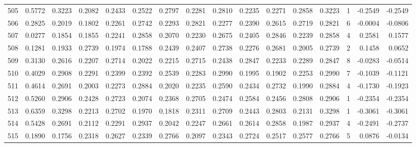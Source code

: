 \begin{tabular}{lrrrrrrrrrrrrrrr}
505 &      0.5772 &  0.3223 &  0.2082 &  0.2433 &  0.2522 &  0.2797 &  0.2281 &  0.2810 &  0.2235 &  0.2271 &   0.2858 &     0.3223 &      1 &                   -0.2549 &                    -0.2549 \\
506 &      0.2825 &  0.2019 &  0.1802 &  0.2261 &  0.2742 &  0.2293 &  0.2821 &  0.2277 &  0.2390 &  0.2615 &   0.2719 &     0.2821 &      6 &                   -0.0004 &                    -0.0806 \\
507 &      0.0277 &  0.1854 &  0.1855 &  0.2241 &  0.2858 &  0.2070 &  0.2230 &  0.2675 &  0.2405 &  0.2846 &   0.2239 &     0.2858 &      4 &                    0.2581 &                     0.1577 \\
508 &      0.1281 &  0.1933 &  0.2739 &  0.1974 &  0.1788 &  0.2439 &  0.2407 &  0.2738 &  0.2276 &  0.2681 &   0.2005 &     0.2739 &      2 &                    0.1458 &                     0.0652 \\
509 &      0.3130 &  0.2616 &  0.2207 &  0.2714 &  0.2022 &  0.2215 &  0.2715 &  0.2438 &  0.2847 &  0.2233 &   0.2289 &     0.2847 &      8 &                   -0.0283 &                    -0.0514 \\
510 &      0.4029 &  0.2908 &  0.2291 &  0.2399 &  0.2392 &  0.2539 &  0.2283 &  0.2990 &  0.1995 &  0.1902 &   0.2253 &     0.2990 &      7 &                   -0.1039 &                    -0.1121 \\
511 &      0.4614 &  0.2691 &  0.2003 &  0.2273 &  0.2884 &  0.2020 &  0.2235 &  0.2590 &  0.2434 &  0.2732 &   0.1990 &     0.2884 &      4 &                   -0.1730 &                    -0.1923 \\
512 &      0.5260 &  0.2906 &  0.2428 &  0.2723 &  0.2074 &  0.2368 &  0.2705 &  0.2474 &  0.2584 &  0.2456 &   0.2808 &     0.2906 &      1 &                   -0.2354 &                    -0.2354 \\
513 &      0.6359 &  0.3298 &  0.2213 &  0.2702 &  0.1970 &  0.1818 &  0.2311 &  0.2709 &  0.2443 &  0.2803 &   0.2131 &     0.3298 &      1 &                   -0.3061 &                    -0.3061 \\
514 &      0.5428 &  0.2691 &  0.2112 &  0.2291 &  0.2937 &  0.2042 &  0.2247 &  0.2661 &  0.2614 &  0.2858 &   0.1987 &     0.2937 &      4 &                   -0.2491 &                    -0.2737 \\
515 &      0.1890 &  0.1756 &  0.2318 &  0.2627 &  0.2339 &  0.2766 &  0.2097 &  0.2343 &  0.2724 &  0.2517 &   0.2577 &     0.2766 &      5 &                    0.0876 &                    -0.0134 \\

\end{tabular}
